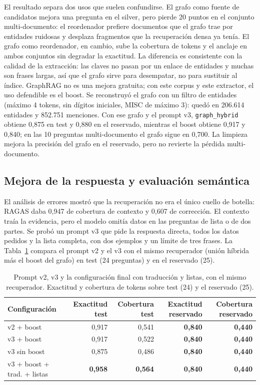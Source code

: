 El resultado separa dos usos que suelen confundirse. El grafo como fuente de candidatos mejora una pregunta en el silver, pero pierde 20 puntos en el conjunto multi-documento: el reordenador prefiere documentos que el grafo trae por entidades ruidosas y desplaza fragmentos que la recuperaci\'on densa ya ten\'ia. El grafo como reordenador, en cambio, sube la cobertura de tokens y el anclaje en ambos conjuntos sin degradar la exactitud. La diferencia es consistente con la calidad de la extracci\'on: las claves no pasan por un enlace de entidades y muchas son frases largas, as\'i que el grafo sirve para desempatar, no para sustituir al \'indice. GraphRAG no es una mejora gratuita; con este corpus y este extractor, el uso defendible es el boost. Se reconstruy\'o el grafo con un filtro de entidades (m\'aximo 4 tokens, sin d\'igitos iniciales, MISC de m\'aximo 3): qued\'o en 206.614 entidades y 852.751 menciones. Con ese grafo y el prompt v3, \texttt{graph\_hybrid} obtiene 0,875 en test y 0,880 en el reservado, mientras el boost obtiene 0,917 y 0,840; en las 10 preguntas multi-documento el grafo sigue en 0,700. La limpieza mejora la precisi\'on del grafo en el reservado, pero no revierte la p\'erdida multi-documento.

\subsection{Mejora de la respuesta y evaluaci\'on sem\'antica}
\label{sec:prompt-v3}

El an\'alisis de errores mostr\'o que la recuperaci\'on no era el \'unico cuello de botella: RAGAS daba 0,947 de cobertura de contexto y 0,607 de correcci\'on. El contexto tra\'ia la evidencia, pero el modelo omit\'ia datos en las preguntas de lista o de dos partes. Se prob\'o un prompt v3 que pide la respuesta directa, todos los datos pedidos y la lista completa, con dos ejemplos y un l\'imite de tres frases. La Tabla~\ref{tab:prompt} compara el prompt v2 y el v3 con el mismo recuperador (uni\'on h\'ibrida m\'as el boost del grafo) en test (24 preguntas) y en el reservado (25).

\begin{table}[t]
\centering
\footnotesize
\caption{Prompt v2, v3 y la configuraci\'on final con traducci\'on y listas, con el mismo recuperador. Exactitud y cobertura de tokens sobre test (24) y el reservado (25).}
\label{tab:prompt}
\begin{tabular}{lrrrr}
\toprule
Configuraci\'on & Exactitud test & Cobertura test & Exactitud reservado & Cobertura reservado \\
\midrule
v2 + boost & 0,917 & 0,541 & \textbf{0,840} & \textbf{0,440} \\
v3 + boost & 0,917 & 0,522 & \textbf{0,840} & \textbf{0,440} \\
v3 sin boost & 0,875 & 0,486 & \textbf{0,840} & \textbf{0,440} \\
v3 + boost + trad. + listas & \textbf{0,958} & \textbf{0,564} & \textbf{0,840} & \textbf{0,440} \\
\bottomrule
\end{tabular}
\end{table}

